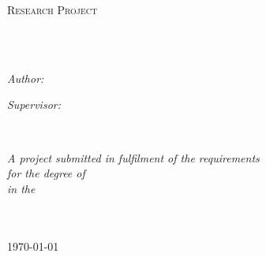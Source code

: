 \documentclass[
11pt,
oneside,
english,
singlespacing,
headsepline,
]{MastersDoctoralThesis}
\author{James \textsc{Leslie}} %
\begin{document}
\frontmatter %

\pagestyle{plain} %


\begin{titlepage}
\begin{center}

\vspace*{.06\textheight}
{\scshape\LARGE \univname\par}\vspace{1.5cm} %
\textsc{\Large Research Project}\\[0.5cm] %

\HRule \\[0.4cm] %
{\huge \bfseries \ttitle\par}\vspace{0.4cm} %
\HRule \\[1.5cm] %
 
\begin{minipage}[t]{0.4\textwidth}
\begin{flushleft} \large
\emph{Author:}\\
\href{https://james-leslie.github.io/E-Portfolio/}{\authorname} %
\end{flushleft}
\end{minipage}
\begin{minipage}[t]{0.4\textwidth}
\begin{flushright} \large
\emph{Supervisor:} \\
\href{http://www.geomatics.uct.ac.za/geomatics/staff/george-sithole}{\supname} %
\end{flushright}
\end{minipage}\\[3cm]
 
\vfill

\large \textit{A project submitted in fulfilment of the requirements\\ for the degree of \degreename}\\[0.3cm]
\textit{in the}\\[0.4cm]
\groupname\\\deptname\\[2cm]
\vfill

{\large \today}\\[4cm] %
 
\vfill
\end{center}
\end{titlepage}
\end{document}
